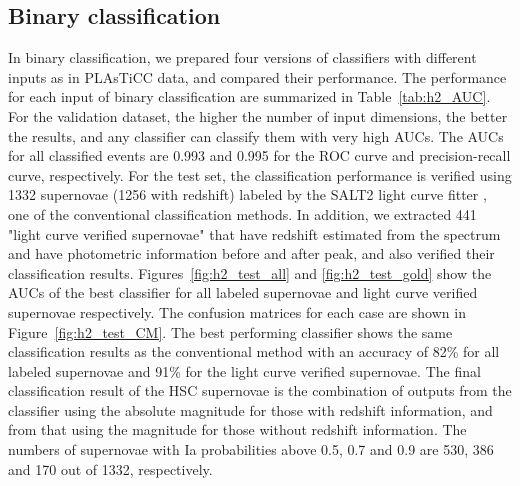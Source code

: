 \documentclass[useamsfonts]{pasj01}
\begin{document}
\subsection{Binary classification}
\label{sec:h2}
%
In binary classification, we prepared four versions of classifiers with different inputs as in PLAsTiCC data, and compared their performance.
The performance for each input of binary classification are summarized in Table\ \ref{tab:h2_AUC}.
For the validation dataset, the higher the number of input dimensions, the better the results, and any classifier can classify them with very high AUCs.
The AUCs for all classified events are 0.993 and 0.995 for the ROC curve and precision-recall curve, respectively.
For the test set, the classification performance is verified using 1332 supernovae (1256 with redshift) labeled by the SALT2 light curve fitter \citep{guy2007,Guy_2010}, one of the conventional classification methods.
In addition, we extracted 441 "light curve verified supernovae" that have redshift estimated from the spectrum and have photometric information before and after peak, and also verified their classification results.
Figures\ \ref{fig:h2_test_all} and \ref{fig:h2_test_gold} show the AUCs of the best classifier for all labeled supernovae and light curve verified supernovae respectively.
The confusion matrices for each case are shown in Figure\ \ref{fig:h2_test_CM}.
The best performing classifier shows the same classification results as the conventional method with an accuracy of 82\% for all labeled supernovae and 91\% for the light curve verified supernovae.
The final classification result of the HSC supernovae is the combination of outputs from the classifier using the absolute magnitude for those with redshift information, and from that using the magnitude for those without redshift information.
The numbers of supernovae with Ia probabilities above 0.5, 0.7 and 0.9 are 530, 386 and 170 out of 1332, respectively.
%
%
%
%
\end{document}
